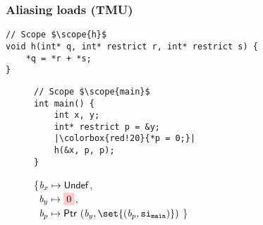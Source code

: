 \begin{frame}[fragile]
\frametitle{Aliasing loads (TMU)}
\begin{verbatim}
// Scope $\scope{h}$
void h(int* q, int* restrict r, int* restrict s) {
    *q = *r + *s; 
}
\end{verbatim}

\begin{figure}[h]
\centering
\begin{minipage}{.36\textwidth}
\begin{verbatim}
// Scope $\scope{main}$
int main() {
    int x, y;
    int* restrict p = &y;
    |\colorbox{red!20}{*p = 0;}|
    h(&x, p, p);
}
\end{verbatim}
\end{minipage}%
\begin{minipage}{.64\textwidth}
\executionannotation
{
\{$\textit{b}_x \mapsto \mathsf{Undef}$, \\
    \ $\Blockvar_y \mapsto \colorbox{red!20}{0}$, \\
    \ $\Blockvar_p \mapsto \ptr{(\Blockvar_y, \set{(\Blockvar_p, \scope{main})})}$
\}
}
{
}
\end{minipage}
\end{figure}


\end{frame}




